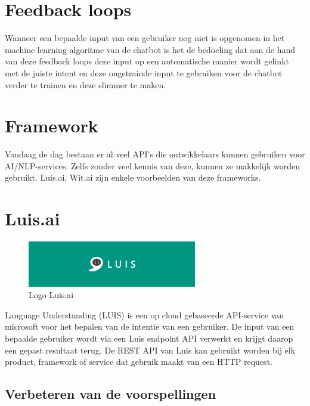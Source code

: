 \section{Feedback loops}
\label{sec:Feedback loops}

Wanneer een bepaalde input van een gebruiker nog niet is opgenomen in het machine learning algoritme van de chatbot is het de bedoeling dat aan de hand van deze feedback loops deze input op een automatische manier wordt gelinkt met de juiste intent en deze ongetrainde input te gebruiken voor de chatbot verder te trainen en deze slimmer te maken.

\section{Framework}
\label{sec:Framework}

Vandaag de dag bestaan er al veel API's die ontwikkelaars kunnen gebruiken voor AI/NLP-services. Zelfs zonder veel kennis van deze, kunnen ze makkelijk worden gebruikt. Luis.ai, Wit.ai zijn enkele voorbeelden van deze frameworks.

\section{Luis.ai}
\label{sec:Luis.ai}

\begin{figure}[h!]
	\centering
	\includegraphics[height=2cm]{luis.png}
	\caption{Logo Luis.ai ~\autocite{Kevin2017}}
	\label{fig:luis}
\end{figure}

Language Understanding (LUIS) is een op cloud gebaseerde API-service van microsoft voor het bepalen van de intentie van een gebruiker.  De input van een bepaalde gebruiker wordt via een Luis endpoint API verwerkt en krijgt daarop een gepast resultaat terug. De REST API van Luis kan gebruikt worden bij elk product, framework of service dat gebruik maakt van een HTTP request. ~\autocite{Dina2019}

\subsection{Verbeteren van de voorspellingen}
\label{verbeteren}

